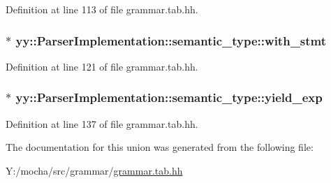 Definition at line 113 of file grammar.tab.hh.

\hypertarget{unionyy_1_1_parser_implementation_1_1semantic__type_ac7ea1e407d1acd113d81f5b8630a42f4}{
\subsubsection[{with\_\-stmt}]{$\ast$ {\bf yy::ParserImplementation::semantic\_\-type::with\_\-stmt}}}
\label{unionyy_1_1_parser_implementation_1_1semantic__type_ac7ea1e407d1acd113d81f5b8630a42f4}


Definition at line 121 of file grammar.tab.hh.

\hypertarget{unionyy_1_1_parser_implementation_1_1semantic__type_a62da8d49bc4860a8759ca76505c3c0f0}{
\subsubsection[{yield\_\-exp}]{$\ast$ {\bf yy::ParserImplementation::semantic\_\-type::yield\_\-exp}}}
\label{unionyy_1_1_parser_implementation_1_1semantic__type_a62da8d49bc4860a8759ca76505c3c0f0}


Definition at line 137 of file grammar.tab.hh.



The documentation for this union was generated from the following file:\begin{DoxyCompactItemize}
\item 
Y:/mocha/src/grammar/\hyperlink{grammar_8tab_8hh}{grammar.tab.hh}\end{DoxyCompactItemize}
